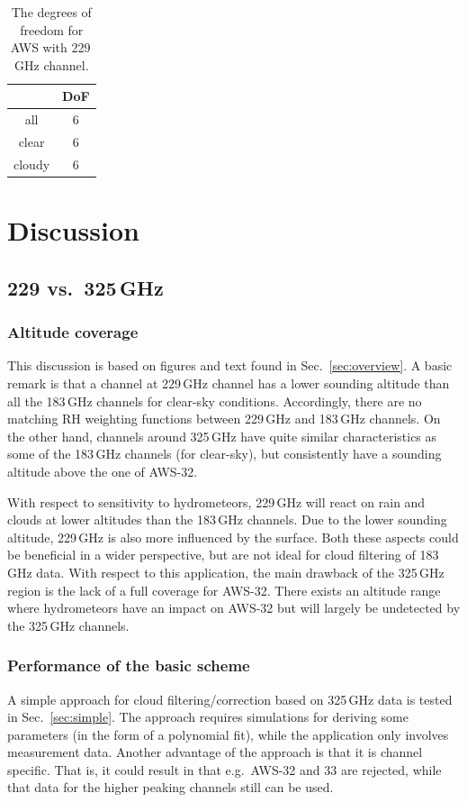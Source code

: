 \documentclass[12pt]{article}
\begin{document}
\begin{table}[!p]
	\centering
	\begin{tabular}[b]{c|c}
		&   DoF \\
		\hline
		all    &      6        \\
		clear  &      6        \\
		cloudy &      6        \\
		\hline
	\end{tabular}
	\caption{The degrees of freedom for AWS with 229\,GHz channel. }
	\label{tab:DoF:4X}
\end{table}


\section{Discussion}

\subsection{229 vs.\ 325\,GHz}
\subsubsection{Altitude coverage}
%
This discussion is based on figures and text found in Sec.~\ref{sec:overview}.
A basic remark is that a channel at 229\,GHz channel has a lower sounding
altitude than all the 183\,GHz channels for clear-sky conditions. Accordingly,
there are no matching RH weighting functions between 229\,GHz and 183\,GHz
channels. On the other hand, channels around 325\,GHz have quite similar
characteristics as some of the 183\,GHz channels (for clear-sky), but
consistently have a sounding altitude above the one of AWS-32.

With respect to sensitivity to hydrometeors, 229\,GHz will react on rain and
clouds at lower altitudes than the 183\,GHz channels. Due to the lower sounding
altitude, 229\,GHz is also more influenced by the surface. Both these aspects
could be beneficial in a wider perspective, but are not ideal for cloud
filtering of 183\,GHz data. With respect to this application, the main drawback
of the 325\,GHz region is the lack of a full coverage for AWS-32. There exists
an altitude range where hydrometeors have an impact on AWS-32 but will largely
be undetected by the 325\,GHz channels.


\subsubsection{Performance of the basic scheme}
%
A simple approach for cloud filtering/correction based on 325\,GHz data is
tested in Sec.~\ref{sec:simple}. The approach requires simulations for deriving
some parameters (in the form of a polynomial fit), while the application only
involves measurement data. Another advantage of the approach is that it is
channel specific. That is, it could result in that e.g.\ AWS-32 and 33 are
rejected, while that data for the higher peaking channels still can be used.
\end{document}
